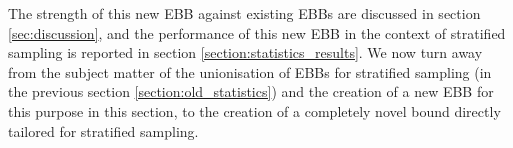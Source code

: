 The strength of this new EBB against existing EBBs are discussed in section \ref{sec:discussion}, and the performance of this new EBB in the context of stratified sampling is reported in section \ref{section:statistics_results}.
We now turn away from the subject matter of the unionisation of EBBs for stratified sampling (in the previous section \ref{section:old_statistics}) and the creation of a new EBB for this purpose in this section, to the creation of a completely novel bound directly tailored for stratified sampling.


